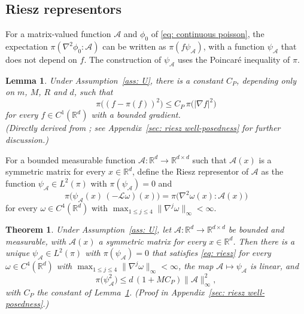 \documentclass{article}
\newtheorem{theorem}{Theorem}
\newtheorem{lemma}{Lemma}
\newcommand{\Le}{\leqslant}
\newcommand{\norm}[1]{\lVert #1 \rVert}
\numberwithin{equation}{section}
\begin{document}
\subsection{Riesz representors}
\label{subsec: riesz}

For a matrix-valued function $\mathcal A$ and $\phi_0$ of \eqref{eq: continuous poisson}, the expectation $\pi( \nabla^2 \phi_0 : \mathcal A )$ can be written as $\pi(f \psi_{\mathcal A})$, with a function $\psi_{\mathcal A}$ that does not depend on $f$. The construction of $\psi_{\mathcal A}$ uses the Poincar\'e inequality of $\pi$.

\begin{lemma}
\label{lem: poincare}
    Under Assumption~\ref{ass: U}, there is a constant $C_P$, depending only on $m$, $M$, $R$ and $d$, such that
    \begin{equation}
        \pi\bigl( (f - \pi(f))^2 \bigr) \Le C_P\, \pi\bigl( |\nabla f|^2 \bigr)
        \label{eq: poincare}
    \end{equation}
    for every $f \in C^1(\mathbb R^d)$ with a bounded gradient.\\[4pt]
    \emph{(Directly derived from \citep[Corollary~1.6 and Theorem~1.4]{bakry2008simple}; see Appendix~\ref{sec: riesz well-posedness} for further discussion.)}
\end{lemma}

For a bounded measurable function $\mathcal A : \mathbb R^d \to \mathbb R^{d \times d}$ such that $\mathcal A(x)$ is a symmetric matrix for every $x \in \mathbb R^d$, define the Riesz representor of $\mathcal A$ as the function $\psi_{\mathcal A} \in L^2(\pi)$ with $\pi(\psi_{\mathcal A}) = 0$ and
\begin{equation}
    \pi\bigl( \psi_{\mathcal A}(x)\, (-\mathcal L \omega)(x) \bigr) = \pi\bigl( \nabla^2 \omega(x) : \mathcal A(x) \bigr)
    \label{eq: riesz}
\end{equation}
for every $\omega \in C^4(\mathbb R^d)$ with $\max_{1 \Le j \Le 4} \norm{\nabla^j \omega}_\infty < \infty$.

\begin{theorem}
\label{thm: riesz}
    Under Assumption~\ref{ass: U}, let $\mathcal A : \mathbb R^d \to \mathbb R^{d \times d}$ be bounded and measurable, with $\mathcal A(x)$ a symmetric matrix for every $x \in \mathbb R^d$. Then there is a unique $\psi_{\mathcal A} \in L^2(\pi)$ with $\pi(\psi_{\mathcal A}) = 0$ that satisfies \eqref{eq: riesz} for every $\omega \in C^4(\mathbb R^d)$ with $\max_{1 \Le j \Le 4} \norm{\nabla^j \omega}_\infty < \infty$, the map $\mathcal A \mapsto \psi_{\mathcal A}$ is linear, and
    \begin{equation}
        \pi\bigl( \psi_{\mathcal A}^2 \bigr) \Le d\, (1 + M C_P) \norm{\mathcal A}_\infty^2 ,
        \label{eq: riesz bound}
    \end{equation}
    with $C_P$ the constant of Lemma~\ref{lem: poincare}.
    \emph{(Proof in Appendix~\ref{sec: riesz well-posedness}.)}
\end{theorem}
\end{document}
